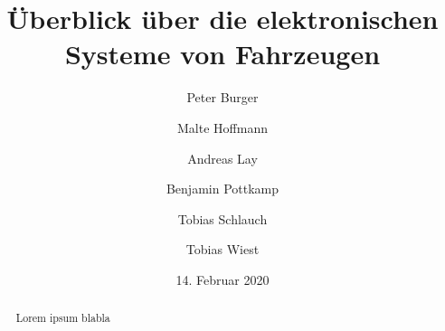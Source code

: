 \documentclass[]{article}
\title{Überblick über die elektronischen Systeme von Fahrzeugen}
\author{
	Peter Burger
	\and
	Malte Hoffmann
	\and
	Andreas Lay
	\and
	Benjamin Pottkamp
	\and
	Tobias Schlauch
	\and
	Tobias Wiest
}
\date{14. Februar 2020}
\begin{document}
\maketitle

\begin{abstract}
Lorem ipsum blabla
\end{abstract}
\newpage
\tableofcontents







\end{document}
